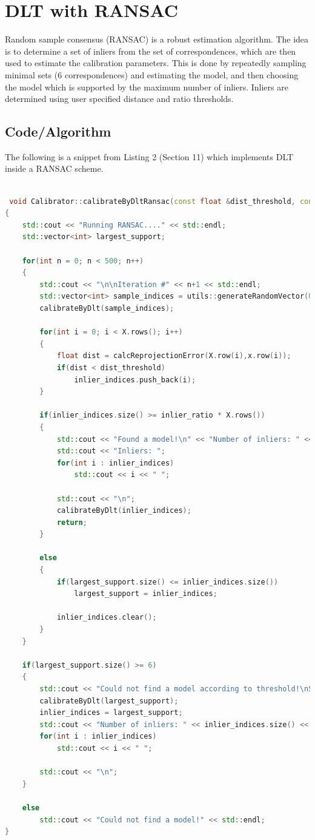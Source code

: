 \documentclass[a4paper,11pt]{article}
\begin{document}
  \vspace{2em}
  
 \section{DLT with RANSAC}
 Random sample consensus (RANSAC) is a robust estimation algorithm. The idea is to determine a set of inliers from the set of correspondences, which are then used to estimate the calibration parameters. This is done by repeatedly sampling minimal sets (6 correspondences) and estimating the model, and then choosing the model which is supported by the maximum number of inliers. Inliers are determined using user specified distance and ratio thresholds.
  \subsection{Code/Algorithm}
  The following is a snippet from Listing 2 (Section 11) which implements DLT inside a RANSAC scheme.
  \begin{lstlisting}[language=C++]
  
 void Calibrator::calibrateByDltRansac(const float &dist_threshold, const float &inlier_ratio, std::vector<int> &inlier_indices)
{	
	std::cout << "Running RANSAC...." << std::endl;
	std::vector<int> largest_support;

	for(int n = 0; n < 500; n++)
	{
		std::cout << "\n\nIteration #" << n+1 << std::endl;
		std::vector<int> sample_indices = utils::generateRandomVector(0,X.rows()-1,6);
		calibrateByDlt(sample_indices);
	
		for(int i = 0; i < X.rows(); i++)
		{
			float dist = calcReprojectionError(X.row(i),x.row(i));
			if(dist < dist_threshold)
				inlier_indices.push_back(i); 
		}

		if(inlier_indices.size() >= inlier_ratio * X.rows())
		{
			std::cout << "Found a model!\n" << "Number of inliers: " << inlier_indices.size() << std::endl;
			std::cout << "Inliers: ";
			for(int i : inlier_indices)
				std::cout << i << " ";

			std::cout << "\n";
			calibrateByDlt(inlier_indices);
			return;
		}
	
		else
		{
			if(largest_support.size() <= inlier_indices.size())
				largest_support = inlier_indices;

			inlier_indices.clear();
		}
	}

	if(largest_support.size() >= 6)
	{
		std::cout << "Could not find a model according to threshold!\nSo using largest inlier set instead." << std::endl;
		calibrateByDlt(largest_support);
		inlier_indices = largest_support;
		std::cout << "Number of inliers: " << inlier_indices.size() << std::endl;
		for(int i : inlier_indices)
			std::cout << i << " ";

		std::cout << "\n";
	}

	else
		std::cout << "Could not find a model!" << std::endl;
} 
  
  \end{lstlisting}
  
\end{document}

